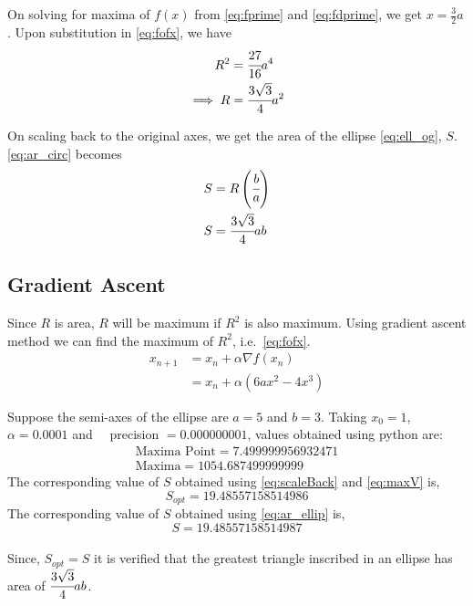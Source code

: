 \documentclass[journal,12pt,twocolumn]{IEEEtran}
\providecommand{\brak}[1]{\ensuremath{\left(#1\right)}}
\begin{document}
On solving for maxima of $f(x)$ from \eqref{eq:fprime} and \eqref{eq:fdprime}, we get $x=\frac{3}{2}a$. Upon substitution in \eqref{eq:fofx}, we have
\begin{align}
		R^2 &= \cfrac{27}{16}a^4 \nonumber\\
		\implies R &= \cfrac{3\sqrt{3}}{4}a^2 \label{eq:ar_circ}
\end{align}

On scaling back to the original axes, we get the area of the ellipse \eqref{eq:ell_og}, $S$. \eqref{eq:ar_circ} becomes
\begin{align}
	S &= R \brak{\cfrac{b}{a}} \label{eq:scaleBack} \\
		S &= \cfrac{3\sqrt{3}}{4}ab \label{eq:ar_ellip}
\end{align}

\subsection*{\textbf{Gradient Ascent}}

Since $R$ is area, $R$ will be maximum if $R^2$ is also maximum. Using gradient ascent method we can find the maximum of $R^2$, i.e.\ \eqref{eq:fofx}.
\begin{align}
	x_{n+1} &= x_n + \alpha \nabla f(x_n) \nonumber \\
	&= x_n + \alpha \brak{6ax^2-4x^3}
\end{align}

Suppose the semi-axes of the ellipse are $a=5$ and $b=3$. Taking $x_0 = 1$, $\alpha=0.0001$ and $\quad$precision $= 0.000000001$, values obtained using python are:
\begin{align}
		\boxed{\text{Maxima Point} = 7.499999956932471} \label{eq:maxPt} \\
		\boxed{\text{Maxima} = 1054.687499999999} \label{eq:maxV}
\end{align}
\newpage
The corresponding value of $S$ obtained using \eqref{eq:scaleBack} and \eqref{eq:maxV} is, \[ \boxed{S_{opt}=19.48557158514986} \]
The corresponding value of $S$ obtained using \eqref{eq:ar_ellip} is, \[ \boxed{S=19.48557158514987} \]
\\
Since, $S_{opt}=S$ it is verified that the greatest triangle inscribed in an ellipse has area of $\cfrac{3\sqrt{3}}{4}{}ab$.
\medskip

\begin{figure}[h]
\centering
\def\figwidth{\linewidth}
\def\figheight{0.315\textheight} %

\label{fig:rough}
\end{figure}
\end{document}
